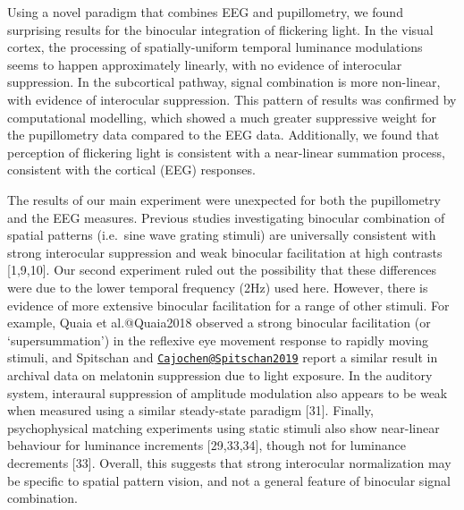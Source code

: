 \documentclass[
]{article}
\begin{document}
Using a novel paradigm that combines EEG and pupillometry, we found surprising results for the binocular integration of flickering light. In the visual cortex, the processing of spatially-uniform temporal luminance modulations seems to happen approximately linearly, with no evidence of interocular suppression. In the subcortical pathway, signal combination is more non-linear, with evidence of interocular suppression. This pattern of results was confirmed by computational modelling, which showed a much greater suppressive weight for the pupillometry data compared to the EEG data. Additionally, we found that perception of flickering light is consistent with a near-linear summation process, consistent with the cortical (EEG) responses.

The results of our main experiment were unexpected for both the pupillometry and the EEG measures. Previous studies investigating binocular combination of spatial patterns (i.e.~sine wave grating stimuli) are universally consistent with strong interocular suppression and weak binocular facilitation at high contrasts {[}1,9,10{]}. Our second experiment ruled out the possibility that these differences were due to the lower temporal frequency (2Hz) used here. However, there is evidence of more extensive binocular facilitation for a range of other stimuli. For example, Quaia et al.@Quaia2018 observed a strong binocular facilitation (or `supersummation') in the reflexive eye movement response to rapidly moving stimuli, and Spitschan and \href{mailto:Cajochen@Spitschan2019}{\nolinkurl{Cajochen@Spitschan2019}} report a similar result in archival data on melatonin suppression due to light exposure. In the auditory system, interaural suppression of amplitude modulation also appears to be weak when measured using a similar steady-state paradigm {[}31{]}. Finally, psychophysical matching experiments using static stimuli also show near-linear behaviour for luminance increments {[}29,33,34{]}, though not for luminance decrements {[}33{]}. Overall, this suggests that strong interocular normalization may be specific to spatial pattern vision, and not a general feature of binocular signal combination.
\end{document}

